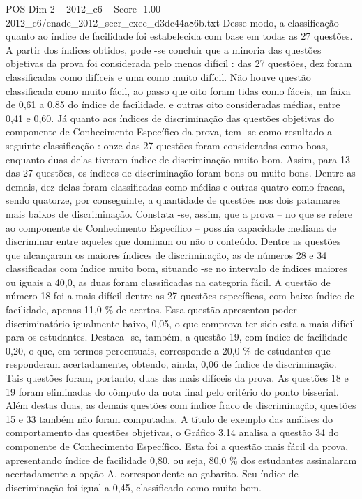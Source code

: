 \begin{textsample}{POS Dim 2 – 2012\_c6 – Score -1.00 – 2012\_c6/enade\_2012\_secr\_exec\_d3dc44a86b.txt}
Desse modo, a classificação quanto ao índice de facilidade foi estabelecida com base em todas as 27 questões.
A partir dos índices obtidos, pode -se concluir que a minoria das questões objetivas da prova foi considerada pelo menos difícil : das 27 questões, dez foram classificadas como difíceis e uma como muito difícil.
Não houve questão classificada como muito fácil, ao passo que oito foram tidas como fáceis, na faixa de 0,61 a 0,85 do índice de facilidade, e outras oito consideradas médias, entre 0,41 e 0,60.
Já quanto aos índices de discriminação das questões objetivas do componente de Conhecimento Específico da prova, tem -se como resultado a seguinte classificação : onze das 27 questões foram consideradas como boas, enquanto duas delas tiveram índice de discriminação muito bom.
Assim, para 13 das 27 questões, os índices de discriminação foram bons ou muito bons.
Dentre as demais, dez delas foram classificadas como médias e outras quatro como fracas, sendo quatorze, por conseguinte, a quantidade de questões nos dois patamares mais baixos de discriminação.
Constata -se, assim, que a prova – no que se refere ao componente de Conhecimento Específico – possuía capacidade mediana de discriminar entre aqueles que dominam ou não o conteúdo.
Dentre as questões que alcançaram os maiores índices de discriminação, as de números 28 e 34 classificadas com índice muito bom, situando -se no intervalo de índices maiores ou iguais a 40,0, as duas foram classificadas na categoria fácil.
A questão de número 18 foi a mais difícil dentre as 27 questões específicas, com baixo índice de facilidade, apenas 11,0 \% de acertos.
Essa questão apresentou poder discriminatório igualmente baixo, 0,05, o que comprova ter sido esta a mais difícil para os estudantes.
Destaca -se, também, a questão 19, com índice de facilidade 0,20, o que, em termos percentuais, corresponde a 20,0 \% de estudantes que responderam acertadamente, obtendo, ainda, 0,06 de índice de discriminação.
Tais questões foram, portanto, duas das mais difíceis da prova.
As questões 18 e 19 foram eliminadas do cômputo da nota final pelo critério do ponto bisserial.
Além destas duas, as demais questões com índice fraco de discriminação, questões 15 e 33 também não foram computadas.
A título de exemplo das análises do comportamento das questões objetivas, o Gráfico 3.14 analisa a questão 34 do componente de Conhecimento Específico.
Esta foi a questão mais fácil da prova, apresentando índice de facilidade 0,80, ou seja, 80,0 \% dos estudantes assinalaram acertadamente a opção A, correspondente ao gabarito.
Seu índice de discriminação foi igual a 0,45, classificado como muito bom.

\end{textsample}
